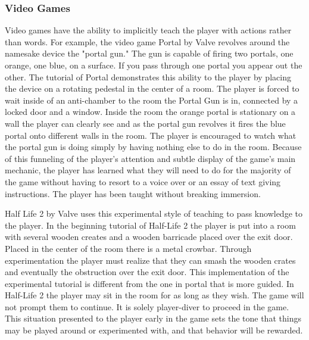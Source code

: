 \documentclass[onecolumn, draftclsnofoot,10pt, compsoc]{IEEEtran}
\begin{document}
\subsubsection{Video Games}
Video games have the ability to implicitly teach the player with actions rather than words. For example, the video game Portal by Valve revolves around the namesake device the "portal gun." The gun is capable of firing two portals, one orange, one blue, on a surface. If you pass through one portal you appear out the other. The tutorial of Portal demonstrates this ability to the player by placing the device on a rotating pedestal in the center of a room. The player is forced to wait inside of an anti-chamber to the room the Portal Gun is in, connected by a locked door and a window. Inside the room the orange portal is stationary on a wall the player can clearly see and as the portal gun revolves it fires the blue portal onto different walls in the room. The player is encouraged to watch what the portal gun is doing simply by having nothing else to do in the room. Because of this funneling of the player's attention and subtle display of the game's main mechanic, the player has learned what they will need to do for the majority of the game without having to resort to a voice over or an essay of text giving instructions. The player has been taught without breaking immersion. \cite{portal}

Half Life 2 by Valve uses this experimental style of teaching to pass knowledge to the player. In the beginning tutorial of Half-Life 2 the player is put into a room with several wooden creates and a wooden barricade placed over the exit door. Placed in the center of the room there is a metal crowbar. Through experimentation the player must realize that they can smash the wooden crates and eventually the obstruction over the exit door. This implementation of the experimental tutorial is different from the one in portal that is more guided. In Half-Life 2 the player may sit in the room for as long as they wish. The game will not prompt them to continue. It is solely player-diver to proceed in the game. This situation presented to the player early in the game sets the tone that things may be played around or experimented with, and that behavior will be rewarded.
\cite{hl2}
\end{document}
